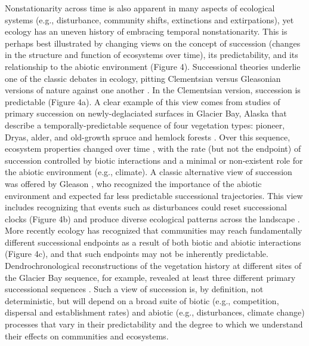 \documentclass[11pt,a4paper,oneside]{article}
\begin{document}
Nonstationarity across time is also apparent in many aspects of ecological systems (e.g., disturbance, community shifts, extinctions and extirpations), yet ecology has an uneven history of embracing temporal nonstationarity. This is perhaps best illustrated by changing views on the concept of succession (changes in the structure and function of ecosystems over time), its predictability, and its relationship to the abiotic environment (Figure 4). Successional theories underlie one of the classic debates in ecology, pitting Clementsian versus Gleasonian versions of nature against one another \citep{clementsbook,gleason1926}. In the Clementsian version, succession is predictable (Figure 4a). A clear example of this view comes from studies of primary succession on newly-deglaciated surfaces in Glacier Bay, Alaska that describe a temporally-predictable sequence of four vegetation types: pioneer, Dryas, alder, and old-growth spruce and hemlock forests \citep{cooper1923}. Over this sequence, ecosystem properties changed over time \citep{Chapin1994}, with the rate (but not the endpoint) of succession controlled by biotic interactions and a minimal or non-existent role for the abiotic environment (e.g., climate). A classic alternative view of succession was offered by Gleason \citep{gleason1926}, who recognized the importance of the abiotic environment and expected far less predictable successional trajectories. This view includes recognizing that events such as disturbances could reset successional clocks (Figure 4b) and produce diverse ecological patterns across the landscape \citep{Levin:1992rg,romme2011}. More recently ecology has recognized that communities may reach fundamentally different successional endpoints as a result of both biotic and abiotic interactions (Figure 4c), and that such endpoints may not be inherently predictable. Dendrochronological reconstructions of the vegetation history at different sites of the Glacier Bay sequence, for example, revealed at least three different primary successional sequences \citep{Fastie1995}. Such a view of succession is, by definition, not deterministic, but will depend on a broad suite of biotic (e.g., competition, dispersal and establishment rates) and abiotic (e.g., disturbances, climate change) processes that vary in their predictability and the degree to which we understand their effects on communities and ecosystems.\\
\end{document}
